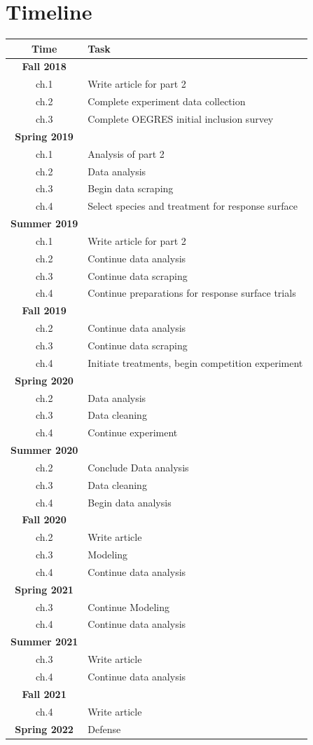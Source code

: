 \documentclass{article}\usepackage[]{graphicx}\usepackage[]{color}
\begin{document}
\section*{Timeline}
\begin{center}
\begin{tabular}{|c|l|}
\hline
Time & Task\\
\hline
\textbf{Fall 2018}& \\
ch.1 & Write article for part 2\\
ch.2 & Complete experiment data collection\\
ch.3 & Complete OEGRES initial inclusion survey\\
\hline
\textbf{Spring 2019}& \\
ch.1 & Analysis of part 2\\
ch.2 & Data analysis\\
ch.3 & Begin data scraping\\
ch.4 & Select species and treatment for response surface \\
\hline
\textbf{Summer 2019}& \\
ch.1 & Write article for part 2\\
ch.2 & Continue data analysis\\
ch.3 & Continue data scraping\\
ch.4 & Continue preparations for response surface trials \\
\hline
\textbf{Fall 2019}& \\
ch.2 & Continue data analysis\\
ch.3 & Continue data scraping\\
ch.4 & Initiate treatments, begin competition experiment \\
\hline
\textbf{Spring 2020}& \\
ch.2 & Data analysis\\
ch.3 & Data cleaning\\
ch.4 & Continue experiment\\
\hline
\textbf{Summer 2020}& \\
ch.2 & Conclude Data analysis\\
ch.3 & Data cleaning\\
ch.4 & Begin data analysis\\
\hline
\textbf{Fall 2020}& \\
ch.2 & Write article\\
ch.3 & Modeling\\
ch.4 & Continue data analysis\\
\hline
\textbf{Spring 2021}& \\
ch.3 & Continue Modeling\\
ch.4 & Continue data analysis\\
\hline
\textbf{Summer 2021}& \\
ch.3 & Write article\\
ch.4 & Continue data analysis\\
\hline
\textbf{Fall 2021}& \\
ch.4 & Write article\\
\hline
\textbf{Spring 2022}& Defense \\
\hline
\end{tabular}
\end{center}
\end{document}
